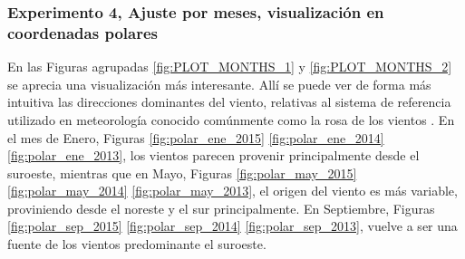 \subsubsection{Experimento 4, Ajuste por meses, visualización en coordenadas polares}
En las Figuras agrupadas \ref{fig:PLOT_MONTHS_1} y \ref{fig:PLOT_MONTHS_2} se aprecia una visualización más interesante. Allí se puede ver de forma más intuitiva las direcciones dominantes del viento, relativas al sistema de referencia utilizado en meteorología conocido comúnmente como la rosa de los vientos \cite{RosaViento}. En el mes de Enero, Figuras \ref{fig:polar_ene_2015} \ref{fig:polar_ene_2014} \ref{fig:polar_ene_2013}, los vientos parecen provenir principalmente desde el suroeste, mientras que en Mayo, Figuras \ref{fig:polar_may_2015} \ref{fig:polar_may_2014} \ref{fig:polar_may_2013}, el origen del viento es más variable, proviniendo desde el noreste y el sur principalmente. En Septiembre, Figuras \ref{fig:polar_sep_2015} \ref{fig:polar_sep_2014} \ref{fig:polar_sep_2013}, vuelve a ser una fuente de los vientos predominante el suroeste.
